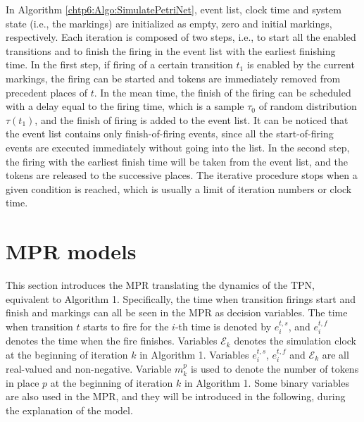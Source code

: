 \documentclass[suppldata]{interact}
\theoremstyle{plain}
\theoremstyle{definition}
\theoremstyle{remark}
\begin{document}
In Algorithm \ref{chtp6:Algo:SimulatePetriNet}, event list, clock time and system state (i.e., the markings) are initialized as empty, zero and initial markings, respectively. Each iteration is composed of two steps, i.e., to start all the enabled transitions and to finish the firing in the event list with the earliest finishing time. In the first step, if firing of a certain transition $t_1$ is enabled by the current markings, the firing can be started and tokens are immediately removed from precedent places of $t$. In the mean time, the finish of the firing can be scheduled with a delay equal to the firing time, which is a sample $\tau_0$ of random distribution $\tau(t_1)$, and the finish of firing is added to the event list. It can be noticed that the event list contains only finish-of-firing events, since all the start-of-firing events are executed immediately without going into the list. In the second step, the firing with the earliest finish time will be taken from the event list, and the tokens are released to the successive places. 
The iterative procedure stops when a given condition is reached, which is usually a limit of iteration numbers or clock time. %


\section{MPR models} \label{sec:TPN_MPR}

This section introduces the MPR translating the dynamics of the TPN, equivalent to Algorithm 1. Specifically, the time when transition firings start and finish and markings can all be seen in the MPR as decision variables. The time when transition $t$ starts to fire for the $i$-th time is denoted by $e^{t,s}_i$, and $e^{t,f}_i$ denotes the time when the fire finishes. Variables $\mathcal{E}_k$ denotes the simulation clock at the beginning of iteration $k$ in Algorithm 1. Variables $e^{t,s}_{i}$, $e^{t,f}_{i}$ and $\mathcal{E}_k$ are all real-valued and non-negative. Variable $m^p_k$ is used to denote the number of tokens in place $p$ at the beginning of iteration $k$ in Algorithm 1. Some binary variables are also used in the MPR, and they will be introduced in the following, during the explanation of the model. 
\end{document}

